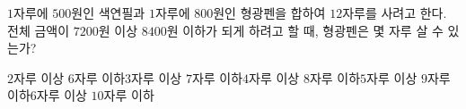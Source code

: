 $1$자루에 $500$원인 색연필과 $1$자루에 $800$원인 형광펜을 합하여 $12$자루를 사려고 한다. 전체 금액이 $7200$원 이상 $8400$원 이하가 되게 하려고 할 때, 형광펜은 몇 자루 살 수 있는가?
\begin{choicesv}{$2$자루 이상 $6$자루 이하}{$3$자루 이상 $7$자루 이하}{$4$자루 이상 $8$자루 이하}{$5$자루 이상 $9$자루 이하}{$6$자루 이상 $10$자루 이하}\end{choicesv}
